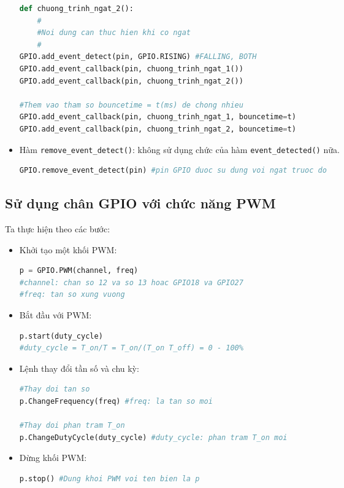 \begin{itemize}
\begin{lstlisting}[language=Python]
def chuong_trinh_ngat_2():
	#
	#Noi dung can thuc hien khi co ngat
	#
GPIO.add_event_detect(pin, GPIO.RISING) #FALLING, BOTH
GPIO.add_event_callback(pin, chuong_trinh_ngat_1())
GPIO.add_event_callback(pin, chuong_trinh_ngat_2())

#Them vao tham so bouncetime = t(ms) de chong nhieu
GPIO.add_event_callback(pin, chuong_trinh_ngat_1, bouncetime=t)
GPIO.add_event_callback(pin, chuong_trinh_ngat_2, bouncetime=t)
\end{lstlisting}
\item Hàm \verb|remove_event_detect()|: không sử dụng chức của hàm \verb|event_detected()| nữa.
\begin{lstlisting}[language=Python]
GPIO.remove_event_detect(pin) #pin GPIO duoc su dung voi ngat truoc do
\end{lstlisting}
\end{itemize}
\subsection{Sử dụng chân GPIO với chức năng PWM}
Ta thực hiện theo các bước:
\begin{itemize}
\item Khởi tạo một khối PWM:
\begin{lstlisting}[language=Python]
p = GPIO.PWM(channel, freq)
#channel: chan so 12 va so 13 hoac GPIO18 va GPIO27
#freq: tan so xung vuong
\end{lstlisting}
\item Bắt đầu với PWM:
\begin{lstlisting}[language=Python]
p.start(duty_cycle)
#duty_cycle = T_on/T = T_on/(T_on T_off) = 0 - 100%
\end{lstlisting}
\item Lệnh thay đổi tần số và chu kỳ:
\begin{lstlisting}[language=Python]
#Thay doi tan so
p.ChangeFrequency(freq) #freq: la tan so moi

#Thay doi phan tram T_on
p.ChangeDutyCycle(duty_cycle) #duty_cycle: phan tram T_on moi
\end{lstlisting}
\item Dừng khối PWM:
\begin{lstlisting}[language=Python]
p.stop() #Dung khoi PWM voi ten bien la p
\end{lstlisting}
\end{itemize}
